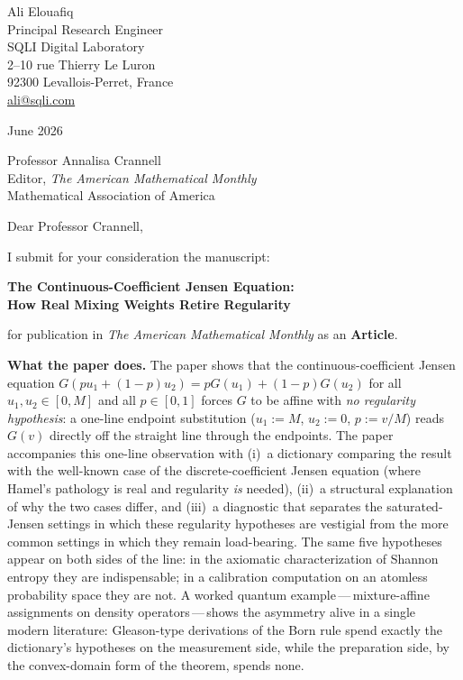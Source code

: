 \documentclass[12pt]{article}
\begin{document}
\noindent
Ali Elouafiq\\
Principal Research Engineer\\
SQLI Digital Laboratory\\
2--10 rue Thierry Le Luron\\
92300 Levallois-Perret, France\\
\href{mailto:ali@sqli.com}{ali@sqli.com}

\bigskip
{} June 2026

\bigskip
\noindent
Professor Annalisa Crannell\\
Editor, \textit{The American Mathematical Monthly}\\
Mathematical Association of America

\bigskip
\noindent
Dear Professor Crannell,

\medskip
\noindent
I submit for your consideration the manuscript:

\begin{center}
  \textbf{The Continuous-Coefficient Jensen Equation:}\\
  \textbf{How Real Mixing Weights Retire Regularity}
\end{center}

\noindent
for publication in \textit{The American Mathematical Monthly} as an
\textbf{Article}.

\bigskip
\noindent\textbf{What the paper does.}
The paper shows that the continuous-coefficient Jensen equation
$G(pu_1+(1-p)u_2)=pG(u_1)+(1-p)G(u_2)$ for all $u_1,u_2\in[0,M]$ and
all $p\in[0,1]$ forces $G$ to be affine with \emph{no regularity
hypothesis}: a one-line endpoint substitution ($u_1{:=}M$, $u_2{:=}0$,
$p{:=}v/M$) reads $G(v)$ directly off the straight line through the
endpoints. The paper accompanies this one-line observation with
(i)~a dictionary comparing the result with the well-known case of the
discrete-coefficient Jensen equation (where Hamel's pathology is real
and regularity \emph{is} needed), (ii)~a structural explanation of
why the two cases differ, and (iii)~a diagnostic that separates the
saturated-Jensen settings in which these regularity hypotheses are
vestigial from the more common settings in which they remain
load-bearing. The same five hypotheses appear on both sides of the
line: in the axiomatic characterization of Shannon entropy they are
indispensable; in a calibration computation on an atomless
probability space they are not. A worked quantum
example\,---\,mixture-affine assignments on density
operators\,---\,shows the asymmetry alive in a single modern
literature: Gleason-type derivations of the Born rule spend exactly
the dictionary's hypotheses on the measurement side, while the
preparation side, by the convex-domain form of the theorem, spends
none.
\end{document}
